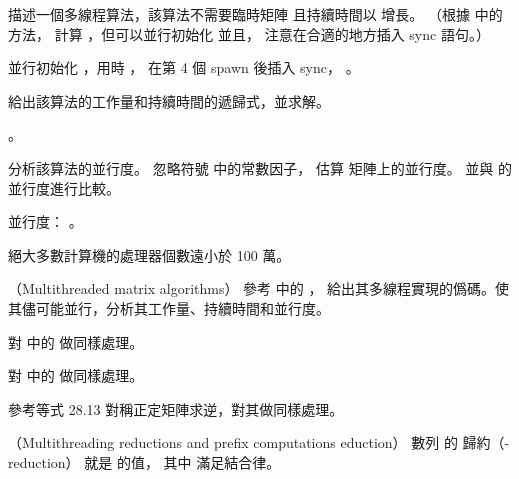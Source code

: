\startigBase[a]\startitem
描述一個多線程算法，該算法不需要臨時矩陣  且持續時間以  增長。
（\hint 根據  中的方法，
計算 ，但可以並行初始化  並且，
注意在合適的地方插入 sync 語句。）
\stopitem\stopigBase

\startANSWER
並行初始化 ，用時 ，
在第 4 個 spawn  後插入 sync，
 。
\stopANSWER

\startigBase[continue]\startitem
給出該算法的工作量和持續時間的遞歸式，並求解。
\stopitem\stopigBase

\startANSWER
{}。
\stopANSWER

\startigBase[continue]\startitem
分析該算法的並行度。
忽略符號 \m{\Theta} 中的常數因子，
估算  矩陣上的並行度。
並與  的並行度進行比較。
\stopitem\stopigBase

\startANSWER
並行度： 。

絕大多數計算機的處理器個數遠小於 100 萬。
\stopANSWER
\stopPROBLEM

\startPROBLEM
（Multithreaded matrix algorithms）
\startigBase[a]\startitem
參考 中的 ，
給出其多線程實現的僞碼。使其儘可能並行，分析其工作量、持續時間和並行度。
\stopitem\stopigBase

\startANSWER
{}
\stopANSWER

\startigBase[continue]\startitem
對 中的  做同樣處理。
\stopitem\stopigBase
\stopPROBLEM

\startANSWER
{}
\stopANSWER

\startigBase[continue]\startitem
對 中的  做同樣處理。
\stopitem\stopigBase

\startANSWER
{}
\stopANSWER

\startigBase[continue]\startitem
參考等式 28.13 對稱正定矩陣求逆，對其做同樣處理。
\stopitem\stopigBase

\startANSWER
{}
\stopANSWER
\stopPROBLEM

\startPROBLEM
（Multithreading reductions and prefix computations eduction）
數列  的 \m{\otimes} {\EMP 歸約}（\m{\otimes}-reduction）
就是  的值，
其中 \m{\otimes} 滿足結合律。

